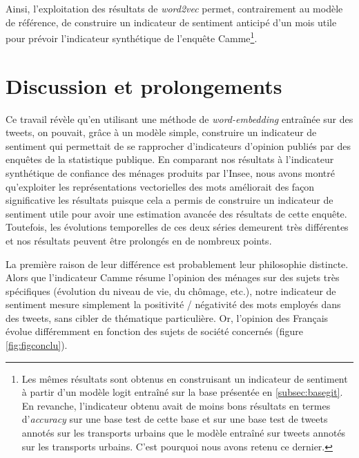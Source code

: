 \documentclass[11pt,french,french]{article}
\let\rmarkdownfootnote\footnote%
\def\footnote{\protect\rmarkdownfootnote}
\begin{document}
Ainsi, l'exploitation des résultats de \emph{word2vec} permet,
contrairement au modèle de référence, de construire un indicateur de
sentiment anticipé d'un mois utile pour prévoir l'indicateur synthétique
de l'enquête Camme\footnote{Les mêmes résultats sont obtenus en
  construisant un indicateur de sentiment à partir d'un modèle logit
  entraîné sur la base présentée en \ref{subsec:basegit}. En revanche,
  l'indicateur obtenu avait de moins bons résultats en termes
  d'\emph{accuracy} sur une base test de cette base et sur une base test
  de tweets annotés sur les transports urbains que le modèle entraîné
  sur tweets annotés sur les transports urbains. C'est pourquoi nous
  avons retenu ce dernier.}.

\section*{Discussion et
prolongements}\label{discussion-et-prolongements}

Ce travail révèle qu'en utilisant une méthode de \emph{word-embedding}
entraînée sur des tweets, on pouvait, grâce à un modèle simple,
construire un indicateur de sentiment qui permettait de se rapprocher
d'indicateurs d'opinion publiés par des enquêtes de la statistique
publique. En comparant nos résultats à l'indicateur synthétique de
confiance des ménages produits par l'Insee, nous avons montré
qu'exploiter les représentations vectorielles des mots améliorait des
façon significative les résultats puisque cela a permis de construire un
indicateur de sentiment utile pour avoir une estimation avancée des
résultats de cette enquête. Toutefois, les évolutions temporelles de ces
deux séries demeurent très différentes et nos résultats peuvent être
prolongés en de nombreux points.

La première raison de leur différence est probablement leur philosophie
distincte. Alors que l'indicateur Camme résume l'opinion des ménages sur
des sujets très spécifiques (évolution du niveau de vie, du chômage,
etc.), notre indicateur de sentiment mesure simplement la positivité /
négativité des mots employés dans des tweets, sans cibler de thématique
particulière. Or, l'opinion des Français évolue différemment en fonction
des sujets de société concernés (figure \ref{fig:figconclu}).
\end{document}
